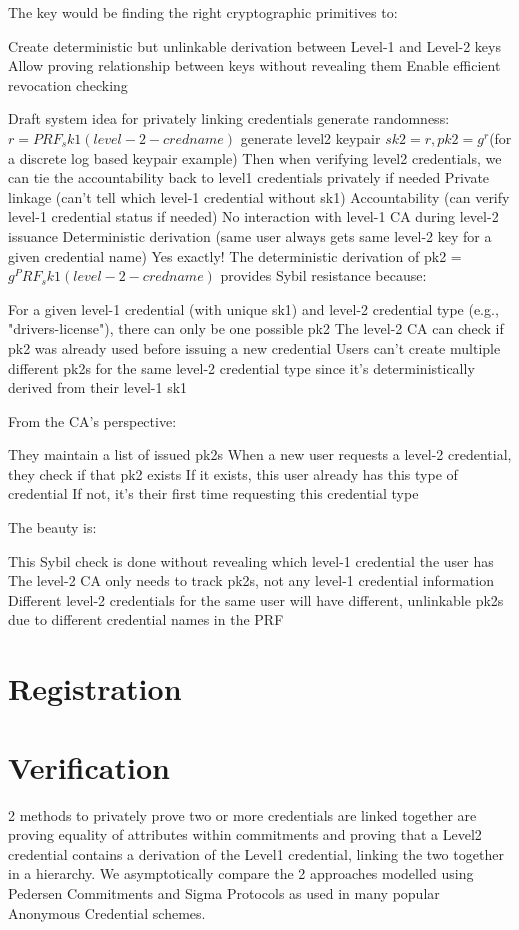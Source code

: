 The key would be finding the right cryptographic primitives to:

Create deterministic but unlinkable derivation between Level-1 and Level-2 keys
Allow proving relationship between keys without revealing them
Enable efficient revocation checking


Draft system idea for privately linking credentials
generate randomness: $r = PRF_sk1(level-2-credname)$
generate level2 keypair $sk2 = r, pk2 = g^r $(for a discrete log based keypair example)
Then when verifying level2 credentials, we can tie the accountability back to level1 credentials privately if needed
Private linkage (can't tell which level-1 credential without sk1)
Accountability (can verify level-1 credential status if needed)
No interaction with level-1 CA during level-2 issuance
Deterministic derivation (same user always gets same level-2 key for a given credential name)
Yes exactly! The deterministic derivation of pk2 = $g^PRF_sk1(level-2-credname)$ provides Sybil resistance because:

For a given level-1 credential (with unique sk1) and level-2 credential type (e.g., "drivers-license"), there can only be one possible pk2
The level-2 CA can check if pk2 was already used before issuing a new credential
Users can't create multiple different pk2s for the same level-2 credential type since it's deterministically derived from their level-1 sk1

From the CA's perspective:

They maintain a list of issued pk2s
When a new user requests a level-2 credential, they check if that pk2 exists
If it exists, this user already has this type of credential
If not, it's their first time requesting this credential type

The beauty is:

This Sybil check is done without revealing which level-1 credential the user has
The level-2 CA only needs to track pk2s, not any level-1 credential information
Different level-2 credentials for the same user will have different, unlinkable pk2s due to different credential names in the PRF

\newpage
\section{Registration}


\newpage
\section{Verification}
2 methods to privately prove two or more credentials are linked together are proving equality of attributes within commitments and proving that a Level2 credential contains a derivation of the Level1 credential, linking the two together in a hierarchy. 
We asymptotically compare the 2 approaches modelled using Pedersen Commitments and Sigma Protocols as used in many popular Anonymous Credential schemes.

